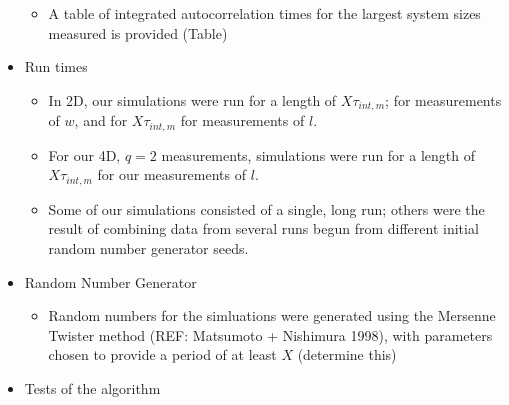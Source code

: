 \documentclass{umthesis}          %
\begin{document}
\begin{itemize}
\begin{itemize}
\item A table of integrated autocorrelation times for the largest system sizes measured is provided (Table)\\
\label{sec-4.2.5.3.2}

\end{itemize} %

\item Run times\\
\label{sec-4.2.5.4}

\begin{itemize}

\item In 2D, our simulations were run for a length of $X \tau_{int,m}$; for measurements of $w$, and for $X  \tau_{int,m}$ for measurements of $l$.\\
\label{sec-4.2.5.4.1}


\item For our 4D, $q=2$ measurements, simulations were run for a length of $X \tau_{int,m}$ for our measurements of $l$.\\
\label{sec-4.2.5.4.2}


\item Some of our simulations consisted of a single, long run; others were the result of combining data from several runs begun from different initial random number generator seeds.\\
\label{sec-4.2.5.4.3}

\end{itemize} %

\item Random Number Generator\\
\label{sec-4.2.5.5}

\begin{itemize}

\item Random numbers for the simluations were generated using the Mersenne Twister method (REF:  Matsumoto + Nishimura 1998), with parameters chosen to provide a period of at least $X$ (determine this)\\
\label{sec-4.2.5.5.1}


\end{itemize} %

\item Tests of the algorithm\\
\label{sec-4.2.5.6}

\begin{itemize}


\end{itemize}
\end{itemize}
\end{document}
